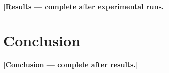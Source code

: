 \documentclass[runningheads]{llncs}
\begin{document}
%
%
%
%

\textbf{[Results — complete after experimental runs.]}

\section{Conclusion}

%
%

\textbf{[Conclusion — complete after results.]}
\end{document}

